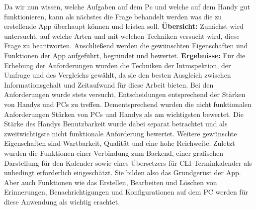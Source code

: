 \myTodo
	Da wir nun wissen, welche Aufgaben auf dem Pc und welche auf dem Handy gut funktionieren, kann als nächstes die Frage behandelt werden \glqq was die zu erstellende App überhaupt können und leisten soll\grqq{}. %
\newline
\textbf{Übersicht:}
	Zunächst wird untersucht, auf welche Arten und mit welchen Techniken versucht wird, diese Frage zu beantworten. %
	Anschließend werden die gewünschten Eigenschaften und Funktionen der App aufgeführt, begründet und bewertet.%
\newline
\textbf{Ergebnisse:} %
Für die Erhebung der Anforderungen wurden die Techniken der Introspektion, der Umfrage und des Vergleichs gewählt, da sie den besten Ausgleich zwischen Informationsgehalt und Zeitaufwand für diese Arbeit bieten. %
Bei den Anforderungen wurde stets versucht, Entscheidungen entsprechend der Stärken von Handys und PCs zu treffen. Dementsprechend wurden die nicht funktionalen Anforderungen \glqq Stärken von PCs und Handys\grqq{} als am wichtigsten bewertet. Die Stärke des Handys \glqq Benutzbarkeit\grqq{} wurde dabei separat betrachtet und als zweitwichtigste nicht funktionale Anforderung bewertet. Weitere gewünschte Eigenschaften sind \glqq Wartbarkeit\grqq{}, \glqq Qualität\grqq{} und eine hohe \glqq Reichweite\grqq{}.%
Zuletzt wurden die Funktionen einer \glqq Verbindung zum Backend\grqq{}, einer \glqq grafischen Darstellung für den Kalender\grqq{} sowie eines \glqq Übersetzers für CLI-Terminkalender\grqq{} als unbedingt erforderlich eingeschätzt. Sie bilden also das Grundgerüst der App. Aber auch Funktionen wie das \glqq Erstellen, Bearbeiten und Löschen von Erinnerungen\grqq{}, \glqq Benachrichtigungen\grqq{} und \glqq Konfigurationen auf dem PC\grqq{} werden für diese Anwendung als wichtig erachtet.
%
%
%
